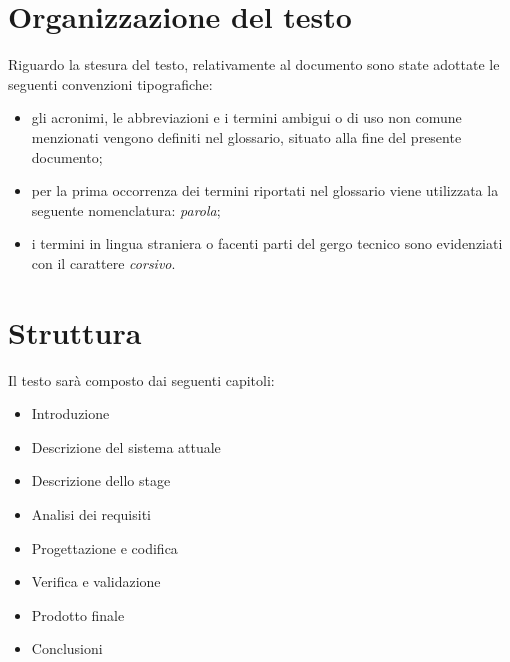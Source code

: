 \section{Organizzazione del testo}
Riguardo la stesura del testo, relativamente al documento sono state adottate le seguenti convenzioni tipografiche:
\begin{itemize}
	\item gli acronimi, le abbreviazioni e i termini ambigui o di uso non comune menzionati vengono definiti nel glossario, situato alla fine del presente documento;
	\item per la prima occorrenza dei termini riportati nel glossario viene utilizzata la seguente nomenclatura: \emph{parola}\glsfirstoccur ;
	\item i termini in lingua straniera o facenti parti del gergo tecnico sono evidenziati con il carattere \emph{corsivo}.
\end{itemize}

\section{Struttura}
Il testo sarà composto dai seguenti capitoli:
\begin{itemize}
\item Introduzione
\item Descrizione del sistema attuale
\item Descrizione dello stage
\item Analisi dei requisiti
\item Progettazione e codifica
\item Verifica e validazione
\item Prodotto finale
\item Conclusioni
\end{itemize}